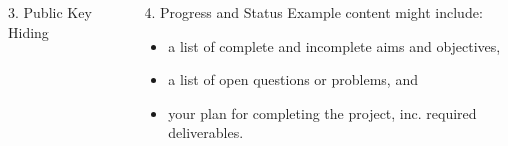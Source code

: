 \documentclass[ %
                    author={Luke Murray},
                supervisor={Dr. Simon Hollis},
                     title={Shadow Peer-to-Peer Networks},
                  subtitle={},
                    degree={MEng},
                      year={2013} ]{poster}
\begin{document}
\begin{frame}{}
\begin{columns}[t]
\begin{column}{0.422\linewidth}
\begin{block}{\Large 3. Public Key Hiding}
    

    \end{block}
    \end{column}
    \begin{column}{0.422\linewidth}
    \begin{block}{\Large 4. Progress and Status}
    Example content might include:

    \begin{itemize}
    \item a list of complete and incomplete aims and objectives,
    \item a list of open questions or problems,
        and
    \item your plan for completing the project, inc. required deliverables.
    \end{itemize}
    \end{block}
    \end{column}
\end{columns}

\vfill

\end{frame}

\end{document}
